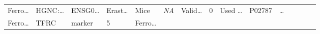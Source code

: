 \documentclass[
]{article}
\begin{document}
\begin{longtable}[]{@{}lllllllllllllll@{}}
\begin{minipage}[t]{0.05\columnwidth}
Ferro\ldots{}\strut
\end{minipage} & \begin{minipage}[t]{0.05\columnwidth}\raggedright
HGNC:\ldots{}\strut
\end{minipage} & \begin{minipage}[t]{0.05\columnwidth}\raggedright
ENSG0\ldots{}\strut
\end{minipage} & \begin{minipage}[t]{0.05\columnwidth}\raggedright
Erast\ldots{}\strut
\end{minipage} & \begin{minipage}[t]{0.04\columnwidth}\raggedright
Mice\strut
\end{minipage} & \begin{minipage}[t]{0.05\columnwidth}\raggedright
\emph{NA}\strut
\end{minipage} & \begin{minipage}[t]{0.05\columnwidth}\raggedright
Valid\ldots{}\strut
\end{minipage} & \begin{minipage}[t]{0.05\columnwidth}\raggedright
0\strut
\end{minipage} & \begin{minipage}[t]{0.05\columnwidth}\raggedright
Used \ldots{}\strut
\end{minipage} & \begin{minipage}[t]{0.05\columnwidth}\raggedright
P02787\strut
\end{minipage} & \begin{minipage}[t]{0.02\columnwidth}\raggedright
\ldots{}\strut
\end{minipage}\tabularnewline
\begin{minipage}[t]{0.05\columnwidth}\raggedright
Ferro\ldots{}\strut
\end{minipage} & \begin{minipage}[t]{0.04\columnwidth}\raggedright
TFRC\strut
\end{minipage} & \begin{minipage}[t]{0.04\columnwidth}\raggedright
marker\strut
\end{minipage} & \begin{minipage}[t]{0.02\columnwidth}\raggedright
5\strut
\end{minipage} & \begin{minipage}[t]{0.05\columnwidth}\raggedright
Ferro\ldots{}\strut
\end{minipage} & \begin{minipage}[t]{0.05\columnwidth}\raggedright

\end{minipage}
\end{longtable}
\end{document}
